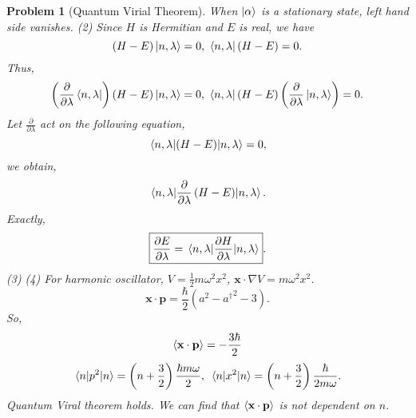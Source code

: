 \documentclass{article}
\theoremstyle{1}
\newtheorem{problem}{Problem}
\newcommand{\pa}{\partial}
\begin{document}
\begin{problem}[Quantum Virial Theorem]
    When $\ket{\alpha}$ is a stationary state, left hand side vanishes.
    \newline
    (2) Since $H$ is Hermitian and $E$ is real, we have 
    \begin{equation}
      (H-E)  \ket{n,\lambda}=0,\ \bra{n,\lambda}(H-E)=0.
    \end{equation}
    Thus, 
    \begin{equation}
        \left(\frac{\pa}{\pa \lambda}\bra{n,\lambda}\right)(H-E)\ket{n,\lambda}=0,\ \bra{n,\lambda}(H-E)\left(\frac{\pa}{\pa \lambda}\ket{n,\lambda}\right)=0.
    \end{equation}
    Let $\frac{\pa}{\pa \lambda}$ act on the following equation,
    \begin{equation}
        \expval{(H-E)}{n,\lambda}=0,
    \end{equation}
    we obtain, 
    \begin{equation}
        \expval{\frac{\pa}{\pa \lambda}\left(H-E\right)}{n,\lambda}.
    \end{equation}
    Exactly,
    \begin{equation}
        \boxed{\frac{\pa E}{\pa \lambda}=\expval{\frac{\pa H}{\pa \lambda}}{n,\lambda}}.
    \end{equation}
    (3) 
    \newline
    (4) For harmonic oscillator, $V=\frac{1}{2}m\omega^2x^2$, $\mathbf{x}\cdot\nabla V=m\omega^2x^2$.
    \begin{equation}
        \mathbf{x}\cdot\mathbf{p}=\frac{\hbar}{2}\left(a^2-{a^\dagger}^2-3\right).
    \end{equation}
    So,
    \begin{equation}
        \expval{\mathbf{x}\cdot\mathbf{p}}=-\frac{3\hbar}{2}
    \end{equation}
    \begin{equation}
        \expval{p^2}{n}=\left(n+\frac{3}{2}\right)\frac{\hbar m \omega}{2},\ \expval{x^2}{n}=\left(n+\frac{3}{2}\right)\frac{\hbar}{2m\omega}.
    \end{equation}
Quantum Viral theorem holds. We can find that $\expval{\mathbf{x}\cdot\mathbf{p}}$ is not dependent on $n$.
\end{problem}
\end{document}
